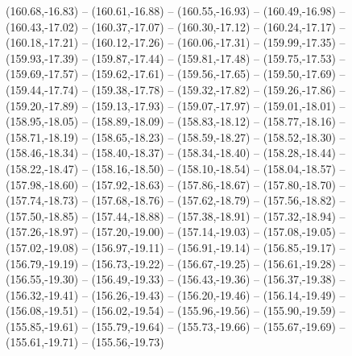 {  (160.68,-16.83) -- (160.61,-16.88) -- (160.55,-16.93) -- (160.49,-16.98) -- (160.43,-17.02) -- (160.37,-17.07) -- (160.30,-17.12) --
  (160.24,-17.17) -- (160.18,-17.21) -- (160.12,-17.26) -- (160.06,-17.31) -- (159.99,-17.35) -- (159.93,-17.39) -- (159.87,-17.44) --
  (159.81,-17.48) -- (159.75,-17.53) -- (159.69,-17.57) -- (159.62,-17.61) -- (159.56,-17.65) -- (159.50,-17.69) -- (159.44,-17.74) --
  (159.38,-17.78) -- (159.32,-17.82) -- (159.26,-17.86) -- (159.20,-17.89) -- (159.13,-17.93) -- (159.07,-17.97) -- (159.01,-18.01) --
  (158.95,-18.05) -- (158.89,-18.09) -- (158.83,-18.12) -- (158.77,-18.16) -- (158.71,-18.19) -- (158.65,-18.23) -- (158.59,-18.27) --
  (158.52,-18.30) -- (158.46,-18.34) -- (158.40,-18.37) -- (158.34,-18.40) -- (158.28,-18.44) -- (158.22,-18.47) -- (158.16,-18.50) --
  (158.10,-18.54) -- (158.04,-18.57) -- (157.98,-18.60) -- (157.92,-18.63) -- (157.86,-18.67) -- (157.80,-18.70) -- (157.74,-18.73) --
  (157.68,-18.76) -- (157.62,-18.79) -- (157.56,-18.82) -- (157.50,-18.85) -- (157.44,-18.88) -- (157.38,-18.91) -- (157.32,-18.94) --
  (157.26,-18.97) -- (157.20,-19.00) -- (157.14,-19.03) -- (157.08,-19.05) -- (157.02,-19.08) -- (156.97,-19.11) -- (156.91,-19.14) --
  (156.85,-19.17) -- (156.79,-19.19) -- (156.73,-19.22) -- (156.67,-19.25) -- (156.61,-19.28) -- (156.55,-19.30) -- (156.49,-19.33) --
  (156.43,-19.36) -- (156.37,-19.38) -- (156.32,-19.41) -- (156.26,-19.43) -- (156.20,-19.46) -- (156.14,-19.49) -- (156.08,-19.51) --
  (156.02,-19.54) -- (155.96,-19.56) -- (155.90,-19.59) -- (155.85,-19.61) -- (155.79,-19.64) -- (155.73,-19.66) -- (155.67,-19.69) --
  (155.61,-19.71) -- (155.56,-19.73)}
